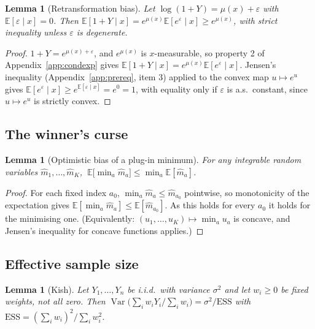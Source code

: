 \documentclass[11pt,a4paper]{article}
\theoremstyle{plain}
\newtheorem{lemma}[theorem]{Lemma}
\theoremstyle{definition}
\theoremstyle{remark}
\DeclareMathOperator{\Var}{Var}
\newcommand{\E}{\mathbb E}
\begin{document}
\begin{lemma}[Retransformation bias]\label{lem:jensen-retrans}
Let $\log(1+Y)=\mu(x)+\varepsilon$ with $\E[\varepsilon\mid x]=0$. Then
$\E[1+Y\mid x]=e^{\mu(x)}\E[e^\varepsilon\mid x]\ge e^{\mu(x)}$, with strict inequality unless
$\varepsilon$ is degenerate.
\end{lemma}

\begin{proof}
$1+Y=e^{\mu(x)+\varepsilon}$, and $e^{\mu(x)}$ is $x$-measurable, so property 2 of
Appendix~\ref{app:condexp} gives $\E[1+Y\mid x]=e^{\mu(x)}\E[e^\varepsilon\mid x]$. Jensen's
inequality (Appendix~\ref{app:prereq}, item 3) applied to the convex map $u\mapsto e^u$ gives
$\E[e^\varepsilon\mid x]\ge e^{\E[\varepsilon\mid x]}=e^0=1$, with equality only if
$\varepsilon$ is a.s.\ constant, since $u\mapsto e^u$ is strictly convex.
\end{proof}

\subsection{The winner's curse}

\begin{lemma}[Optimistic bias of a plug-in minimum]\label{lem:winner}
For any integrable random variables $\hat m_1,\dots,\hat m_K$,
$\ \E\bigl[\min_a\hat m_a\bigr]\le\min_a\E[\hat m_a]$.
\end{lemma}

\begin{proof}
For each fixed index $a_0$, $\min_a\hat m_a\le\hat m_{a_0}$ pointwise, so monotonicity of the
expectation gives $\E[\min_a\hat m_a]\le\E[\hat m_{a_0}]$. As this holds for every $a_0$ it
holds for the minimising one. (Equivalently: $(u_1,\dots,u_K)\mapsto\min_au_a$ is concave, and
Jensen's inequality for concave functions applies.)
\end{proof}

\subsection{Effective sample size}

\begin{lemma}[Kish]\label{lem:ess}
Let $Y_1,\dots,Y_n$ be i.i.d.\ with variance $\sigma^2$ and let $w_i\ge0$ be fixed weights, not
all zero. Then $\Var\bigl(\sum_iw_iY_i/\sum_iw_i\bigr)=\sigma^2/\text{ESS}$ with
$\text{ESS}=(\sum_iw_i)^2/\sum_iw_i^2$.
\end{lemma}
\end{document}
